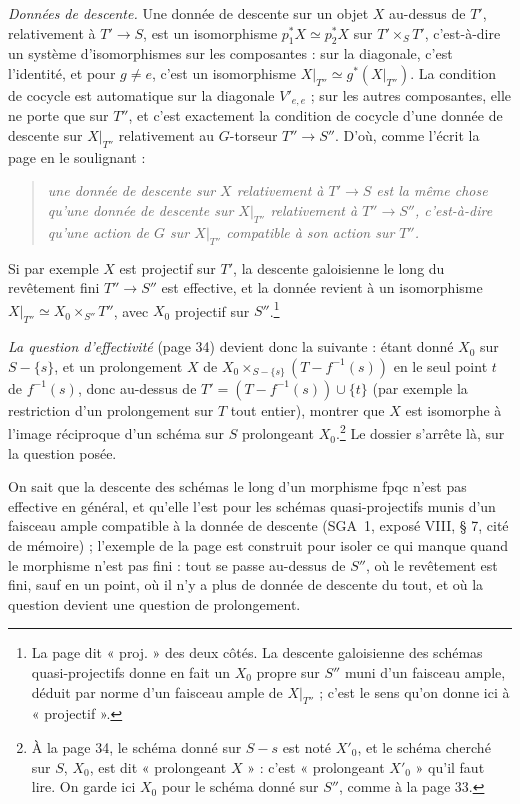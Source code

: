 \documentclass[11pt,a4paper]{article}
\begin{document}
\emph{Données de descente.} Une donnée de descente sur un objet $X$ au-dessus
de $T'$, relativement à $T' \to S$, est un isomorphisme $p_1^{*}X \simeq
p_2^{*}X$ sur $T' \times_S T'$, c'est-à-dire un système d'isomorphismes sur les
composantes : sur la diagonale, c'est l'identité, et pour $g \neq e$, c'est un
isomorphisme $X|_{T''} \simeq g^{*}(X|_{T''})$. La condition de cocycle est
automatique sur la diagonale $V'_{e,e}$ ; sur les autres composantes, elle ne
porte que sur $T''$, et c'est exactement la condition de cocycle d'une donnée
de descente sur $X|_{T''}$ relativement au $G$-torseur $T'' \to S''$. D'où, comme
l'écrit la page en le soulignant :

\begin{quote}
\emph{une donnée de descente sur $X$ relativement à $T' \to S$ est la même
chose qu'une donnée de descente sur $X|_{T''}$ relativement à $T'' \to S''$,
c'est-à-dire qu'une action de $G$ sur $X|_{T''}$ compatible à son action sur
$T''$.}
\end{quote}

Si par exemple $X$ est projectif sur $T'$, la descente galoisienne le long du
revêtement fini $T'' \to S''$ est effective, et la donnée revient à un
isomorphisme $X|_{T''} \simeq X_0 \times_{S''} T''$, avec $X_0$ projectif sur
$S''$.\footnote{La page dit « proj. » des deux côtés. La
descente galoisienne des schémas quasi-projectifs donne en fait un $X_0$ propre sur
$S''$ muni d'un faisceau ample, déduit par norme d'un faisceau ample de
$X|_{T''}$ ; c'est le sens qu'on donne ici à « projectif ».}

\emph{La question d'effectivité} (page 34) devient donc la suivante : étant
donné $X_0$ sur $S - \{s\}$, et un prolongement $X$ de $X_0 \times_{S - \{s\}}
(T - f^{-1}(s))$ en le seul point $t$ de $f^{-1}(s)$, donc au-dessus de $T' =
(T - f^{-1}(s)) \cup \{t\}$ (par exemple la restriction d'un prolongement
sur $T$ tout entier), montrer que $X$ est isomorphe à l'image réciproque d'un
schéma sur $S$ prolongeant $X_0$.\footnote{À la page 34, le schéma donné sur $S
- s$ est noté $X'_0$, et le schéma cherché sur $S$, $X_0$, est dit
« prolongeant $X$ » : c'est « prolongeant $X'_0$ » qu'il faut lire. On garde
ici $X_0$ pour le schéma donné sur $S''$, comme à la page 33.} Le dossier s'arrête là, sur la question posée.

On sait que la descente des schémas le long d'un morphisme fpqc n'est pas
effective en général, et qu'elle l'est pour les schémas quasi-projectifs
munis d'un faisceau ample compatible à la donnée de descente (SGA~1, exposé
VIII, § 7, cité de mémoire) ; l'exemple de la page est construit pour isoler
ce qui manque quand le morphisme n'est pas fini : tout se passe au-dessus de
$S''$, où le revêtement est fini, sauf en un point, où il n'y a plus de
donnée de descente du tout, et où la question devient une question de
prolongement.
\end{document}
